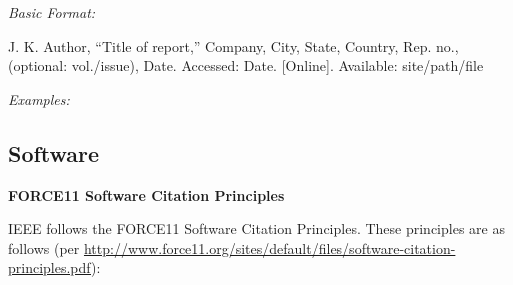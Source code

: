 \documentclass[10pt]{article}
\newcommand*{\guidelabel}[1]{\par\vspace{-4pt}\hspace*{22pt}\textit{#1}\par\vspace{-\parskip}}
\begin{document}
\guidelabel{Basic Format:}
\begin{guideitems}
  \item J. K. Author, “Title of report,” Company, City, State, Country, Rep. no., (optional: vol./issue), Date. Accessed: Date. [Online]. Available: site/path/file
\end{guideitems}
\guidelabel{Examples:}
\begin{guideitems}
  \item {}
  \item {}
  \item {}
  \item {}
  \item {}
  \item {}
  \item {}
  \item {}
\end{guideitems}

\subsection{Software}

\textbf{FORCE11 Software Citation Principles}

IEEE follows the FORCE11 Software Citation Principles. These principles are as follows (per \url{http://www.force11.org/sites/default/files/software-citation-principles.pdf}):
\end{document}
